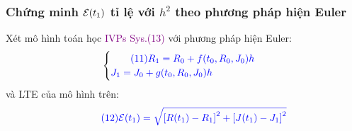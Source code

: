 \documentclass[a4paper]{article}
\begin{document}
            \subsubsection{Chứng minh $\large{\mathcal{E}}(t_1)$ tỉ lệ với $h^2$ theo phương pháp hiện Euler}
	Xét mô hình toán học \textcolor{purple}{IVPs Sys.(13)} với phương pháp hiện Euler: 
	\begin{align}
	    \begin{cases} \textcolor{blue}{\tag{11}}
	     \textcolor{blue}{R_{1} = R_{0} + f(t_{0}, R_{0}, J_{0})h}\\
	     \textcolor{blue}{J_{1} = J_{0} + g(t_{0}, R_{0}, J_{0})h}
	    \end{cases}
	\end{align}
	và LTE của mô hình trên: 
	\begin{align} \textcolor{blue}{\tag{12}}
	    \textcolor{blue}{\large{\mathcal{E}}(t_1) = \sqrt{\left[R(t_{1})-R_{1}\right]^{2}+\left[J(t_{1})-J_{1}\right]^{2}}}
	\end{align}
	
\end{document}
